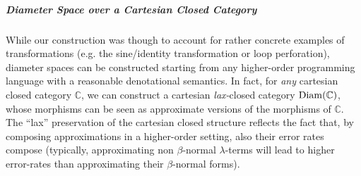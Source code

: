 %
%
%
%
%
%
%
%
%
% 
%
%
%
%
%
%
%





%
\subparagraph*{Diameter Space over a Cartesian Closed Category}
While our construction was though to account for rather concrete examples of transformations (e.g. the sine/identity transformation or loop perforation), diameter spaces can be constructed starting from any higher-order programming language with a reasonable denotational semantics. In fact, for \emph{any} cartesian closed category $\mathbb C$, we can construct a cartesian \emph{lax-}closed category $\operatorname{Diam}(\mathbb C)$, whose morphisms can be seen as approximate versions  of the morphisms of $\mathbb C$. The ``lax'' preservation of the cartesian closed structure reflects the fact that, by composing approximations in a higher-order setting, also their error rates compose (typically, approximating non $\beta$-normal $\lambda$-terms will lead to higher error-rates than approximating their $\beta$-normal forms). 



